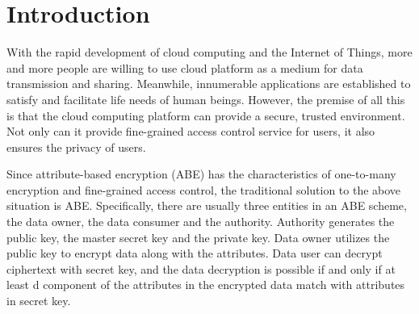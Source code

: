 \documentclass[smallextended]{svjour3}       %
\begin{document}
\section{Introduction}
	With the rapid development of cloud computing and the Internet of Things, more and more people are willing to use cloud platform as a medium for data transmission and sharing.
	Meanwhile, innumerable applications are established to satisfy and facilitate life needs of human beings.
	However, the premise of all this is that the cloud computing platform can provide a secure, trusted environment.
	Not only can it provide fine-grained access control service for users, it also ensures the privacy of users.

	Since attribute-based encryption (ABE) has the characteristics of one-to-many encryption and fine-grained access control, the traditional solution to the above situation is ABE.
	Specifically, there are usually three entities in an ABE scheme, the data owner, the data consumer and the authority. 
	Authority generates the public key, the master secret key and the private key.
	Data owner utilizes the public key to encrypt data along with the attributes.
	Data user can decrypt ciphertext with secret key, and the data decryption is possible if and only if at least d component of the attributes in the encrypted data match with attributes in secret key.
\end{document}
